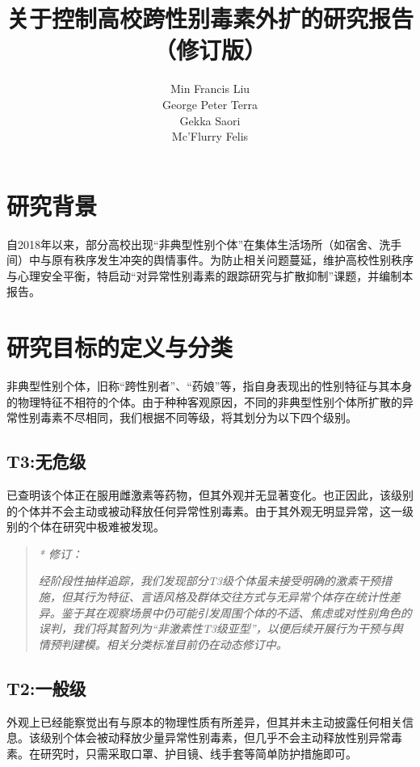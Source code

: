 \documentclass[]{ctexrep}
\begin{document}
	\title{关于控制高校跨性别毒素外扩的研究报告\\（修订版）}
	\author{Min Francis Liu\\ George Peter Terra\\ Gekka Saori\\ Mc'Flurry Felis}
	\date{}
	\maketitle
	\tableofcontents
	\chapter{研究背景}
	自2018年以来，部分高校出现“非典型性别个体”在集体生活场所（如宿舍、洗手间）中与原有秩序发生冲突的舆情事件。为防止相关问题蔓延，维护高校性别秩序与心理安全平衡，特启动“对异常性别毒素的跟踪研究与扩散抑制”课题，并编制本报告。
	
	\chapter{研究目标的定义与分类}
	非典型性别个体，旧称“跨性别者”、“药娘”等，指自身表现出的性别特征与其本身的物理特征不相符的个体。由于种种客观原因，不同的非典型性别个体所扩散的异常性别毒素不尽相同，我们根据不同等级，将其划分为以下四个级别。
	\section{T3:无危级}
	已查明该个体正在服用雌激素等药物，但其外观并无显著变化。也正因此，该级别的个体并不会主动或被动释放任何异常性别毒素。由于其外观无明显异常，这一级别的个体在研究中极难被发现。
	
	\begin{quotation}
	\textit{\hspace{-4em} * 修订：}
	
	\textit{经阶段性抽样追踪，我们发现部分T3级个体虽未接受明确的激素干预措施，但其行为特征、言语风格及群体交往方式与无异常个体存在统计性差异。鉴于其在观察场景中仍可能引发周围个体的不适、焦虑或对性别角色的误判，我们将其暂列为“非激素性T3级亚型”，以便后续开展行为干预与舆情预判建模。相关分类标准目前仍在动态修订中。}
	\end{quotation}
	
	\section{T2:一般级}
	外观上已经能察觉出有与原本的物理性质有所差异，但其并未主动披露任何相关信息。该级别个体会被动释放少量异常性别毒素，但几乎不会主动释放性别异常毒素。在研究时，只需采取口罩、护目镜、线手套等简单防护措施即可。
	
\end{document}
